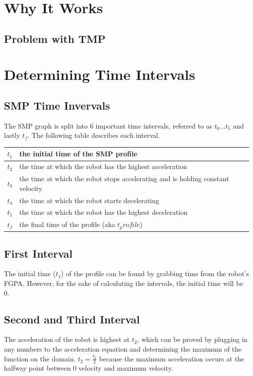 \documentclass[a4paper,12pt]{report}
\newcommand{\tab}{\hspace{20pt}}
\begin{document}
	\chapter{Why It Works}
	\section{Problem with TMP}
	\tab 
	
	\chapter{Determining Time Intervals}
	\section{SMP Time Invervals}
	\tab The SMP graph is split into 6 important time intervals, referred to as $t_0...t_5$ and lastly $t_f$. The following table describes each interval.
	
	\begin{center}
		\begin{tabular}{| l | l |}
			\hline
			$t_1$ & the initial time of the SMP profile \\ \hline
			$t_2$ & the time at which the robot has the highest acceleration \\ \hline
			$t_3$ & the time at which the robot stops accelerating and is holding constant velocity \\ \hline
			$t_4$ & the time at which the robot starts decelerating \\ \hline
			$t_5$ & the time at which the robot has the highest deceleration \\ \hline
			$t_f$ & the final time of the profile (aka $t_profile$) \\ \hline
		\end{tabular}
	\end{center}
	
	\section{First Interval}
	\tab The initial time ($t_1$) of the profile can be found by grabbing time from the robot's FGPA. However, for the sake of calculating the intervals, the initial time will be 0.
	
	\section{Second and Third Interval}
	\tab The acceleration of the robot is highest at $t_2$, which can be proved by plugging in any numbers to the acceleration equation and determining the maximum of the function on the domain. $t_2 = \frac{t_3}{2}$ because the maximum acceleration occurs at the halfway point between 0 velocity and maximum velocity.
	
\end{document}
